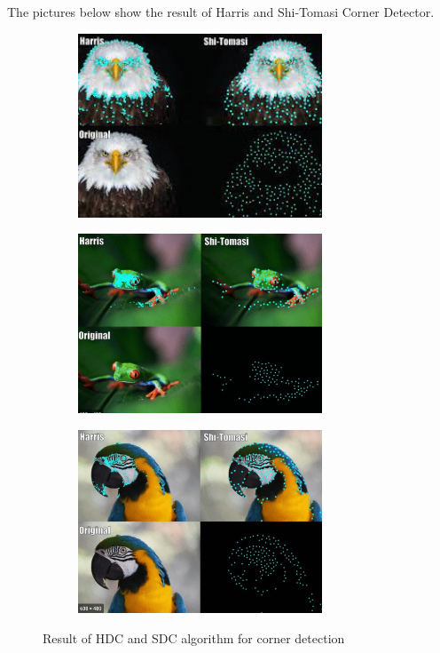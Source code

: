 \documentclass[a4paper, 12pt]{article}
\begin{document}
The pictures below show the result of Harris and Shi-Tomasi Corner Detector.

\begin{figure}[H]
    \centering
    \begin{subfigure}{0.3\textwidth}
        \centering
        \includegraphics[width=0.8\textwidth]{HDC-SDC-1.jpeg}
    \end{subfigure}
    \begin{subfigure}{0.3\textwidth}
        \centering
        \includegraphics[width=0.8\textwidth]{HDC-SDC-2.png}
    \end{subfigure}
    \begin{subfigure}{0.3\textwidth}
        \centering
        \includegraphics[width=0.8\textwidth]{HDC-SDC-3.png}
    \end{subfigure}
    \caption{Result of HDC and SDC algorithm for corner detection}
    \label{Figure}
\end{figure}
\end{document}

